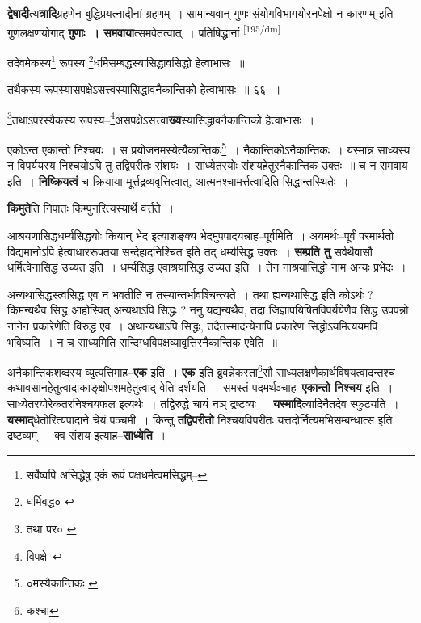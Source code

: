 \documentclass[article,12pt,a4paper]{memoir}
\begin{document}
	  \pstart \textbf{द्वेषादी}त्य\textbf{त्रादि}ग्रहणेन बुद्धिप्रयत्नादीनां ग्रहणम् । सामान्यवान् गुणः संयोगविभागयोरनपेक्षो न कारणम् इति गुणलक्षणयोगाद् \textbf{गुणाः । समवाया}त्समवेतत्वात् । प्रतिषिद्धानां  \leavevmode\textsuperscript{\rmlatinfont\tiny [195/dm]} 
	  
	तदेवमेकस्य\footnote{सर्वेष्वपि असिद्धेषु एकं रूपं पक्षधर्मत्वमसिद्धम्--\cite{dp-msD-n}} रूपस्य \footnote{धर्मिबद्ध० \cite{dp-msA} \cite{dp-edP} \cite{dp-msB} \cite{dp-edH}}धर्मिसम्बद्धस्यासिद्धावसिद्धो हेत्वाभासः ॥ 
	  
	तथैकस्य रूपस्यासपक्षेऽसत्त्वस्यासिद्धावनैकान्तिको हेत्वाभासः ॥ ६६ ॥ 
	  
	\footnote{तथा पर० \cite{dp-msA} \cite{dp-msB} \cite{dp-edP} \cite{dp-edH}}तथाऽपरस्यैकस्य रूपस्य--\footnote{विपक्षे--\cite{dp-msD-n}}असपक्षेऽसत्त्वा\textbf{ख्य}स्यासिद्धावनैकान्तिको हेत्वाभासः । 
	  
	एकोऽन्त एकान्तो निश्चयः । स प्रयोजनमस्येत्यैकान्तिकः\footnote{०मस्यैकान्तिकः \cite{dp-msC} \cite{dp-msD}} । नैकान्तिकोऽनैकान्तिकः । यस्मान्न साध्यस्य न विपर्ययस्य निश्चयोऽपि तु तद्विपरीतः संशयः । साध्येतरयोः संशयहेतुरनैकान्तिक उक्तः ॥ च न समवाय इति । \textbf{निष्क्रियत्वं} च क्रियाया मूर्त्तद्रव्यवृत्तित्वात्, आत्मनश्चामर्त्तत्वादिति सिद्धान्तस्थितेः ।
	\pend
      

	  \pstart \textbf{किमुते}ति निपातः किम्पुनरित्यस्यार्थे वर्त्तते ।
	\pend
      

	  \pstart आश्रयणासिद्धधर्म्यसिद्धयोः कियान् भेद इत्याशङ्क्य भेदमुपपादयन्नाह--पूर्वमिति । अयमर्थः--पूर्वं परमार्थतो विद्यमानोऽपि हेत्वाधाररूपतया सन्देहादनिश्चित इति तद् धर्म्यसिद्ध उक्तः । \textbf{सम्प्रति तु} सर्वथैवासौ धर्मित्वेनासिद्ध उच्यत इति । धर्म्यसिद्ध एवाश्रयासिद्ध उच्यत इति । तेन नाश्रयासिद्धो नाम अन्यः प्रभेदः ।
	\pend
      

	  \pstart अन्यथासिद्धस्त्वसिद्ध एव न भवतीति न तस्यान्तर्भावश्चिन्त्यते । तथा ह्यन्यथासिद्ध इति कोऽर्थः ? किमन्यथैव सिद्ध आहोस्वित् अन्यथाऽपि सिद्धः ? ननु यद्यन्यथैव, तदा जिज्ञापयिषितविपर्ययेणैव सिद्ध उपपन्नो नानेन प्रकारेणेति विरुद्ध एव । अथान्यथाऽपि सिद्धः, तदैतस्मादन्येनापि प्रकारेण सिद्धोऽयमित्ययमपि भविष्यति । न च साध्यमिति सन्दिग्धविपक्षव्यावृत्तिरनैकान्तिक एवेति ॥
	\pend
      

	  \pstart अनैकान्तिकशब्दस्य व्युत्पत्तिमाह--\textbf{एक} इति । \textbf{एक} इति ब्रुवन्नेकस्ता\footnote{कश्चा}सौ साध्यलक्षणैकार्थविषयत्वादन्तश्च कथावसानहेतुत्वादाकाङ्क्षोपशमहेतुत्वाद् वेति दर्शयति । समस्तं पदमर्थञ्चाह--\textbf{एकान्तो निश्चय} इति । साध्येतरयोरेकतरनिश्चयफल इत्यर्थः । तद्विरुद्धे चायं नञ् द्रष्टव्यः । \textbf{यस्मादि}त्यादिनैतदेव स्फुटयति । \textbf{यस्माद्}धेतोरित्यपादाने चेयं पञ्चमी । किन्तु \textbf{तद्विपरीतो} निश्चयविपरीतः यत्तदोर्नित्यमभिसम्बन्धात्स इति द्रष्टव्यम् । क्व संशय इत्याह--\textbf{साध्येति} ।
	\pend
      
\end{document}
